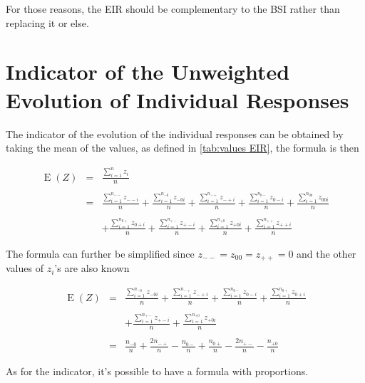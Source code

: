 \documentclass[12pt,a4paper,oneside]{book}
\DeclareMathOperator{\E}{E}
\begin{document}
For those reasons, the EIR should be complementary to the BSI rather than replacing it or else.



\section{Indicator of the Unweighted Evolution of Individual Responses}

The indicator of the evolution of the individual responses can be obtained by taking the mean of the values, as defined in \autoref{tab:values EIR}, the formula is then

\begin{eqnarray}
    \E(Z) &=&  \frac{ \sum_{i=1}^n z_i}{n} \\ \nonumber \\
        &=&  \frac{ \sum_{i=1}^{n_{--}} z_{--i}}{n} 
     +  \frac{\sum_{i=1}^{n_{-0}} z_{-0i} }{n} 
    +  \frac{\sum_{i=1}^{n_{-+}} z_{-+i}}{n} 
    +  \frac{\sum_{i=1}^{n_{0-}} z_{0-i} }{n} 
    +  \frac{\sum_{i=1}^{n_{00}} z_{00i} }{n}  \nonumber \\ \nonumber \\
    &&  +  \frac{\sum_{i=1}^{n_{0+}} z_{0+i}}{n} 
    +  \frac{\sum_{i=1}^{n_{+-}} z_{+-i} }{n} 
    +  \frac{\sum_{i=1}^{n_{+0}} z_{+0i} }{n} 
    +  \frac{\sum_{i=1}^{n_{++}} z_{++i}}{n} 
\end{eqnarray}

The formula can further be simplified since $z_{--} = z_{00} = z_{++} = 0$ and the other values of $z_i$'s are also known

\begin{eqnarray}
    \E(Z) &=&  
      \frac{\sum_{i=1}^{n_{-0}} z_{-0i} }{n} 
    +  \frac{\sum_{i=1}^{n_{-+}} z_{-+i}}{n} 
    +  \frac{\sum_{i=1}^{n_{0-}} z_{0-i} }{n} 
    +  \frac{\sum_{i=1}^{n_{0+}} z_{0+i}}{n}  \nonumber \\ \nonumber \\
&&  +  \frac{\sum_{i=1}^{n_{+-}} z_{+-i} }{n} 
    +  \frac{\sum_{i=1}^{n_{+0}} z_{+0i} }{n}  \\ \nonumber \\
    &=&  \frac{n_{-0}}{n} 
    +   \frac{2n_{-+}}{n} 
    -    \frac{n_{0-}}{n} 
    +    \frac{n_{0+}}{n}  
    -   \frac{2n_{+-}}{n} 
    -    \frac{n_{+0}}{n} 
\end{eqnarray}




As for the indicator, it's possible to have a formula with proportions.
\end{document}
